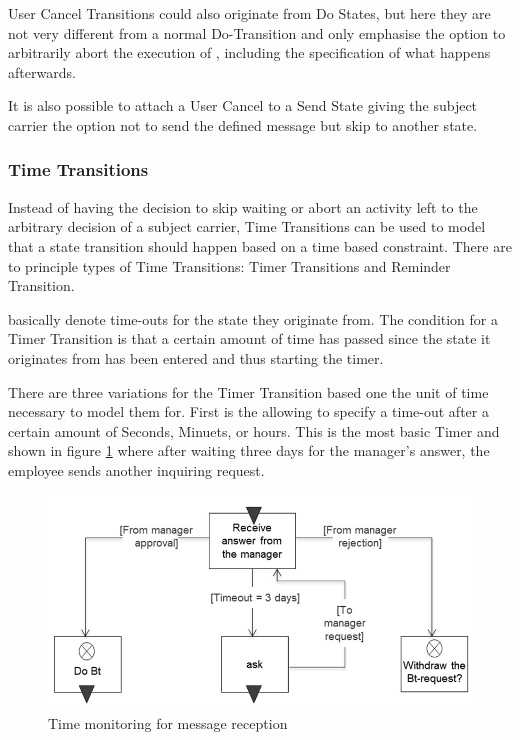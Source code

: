 User Cancel Transitions could also originate from Do States, but here they are not very different from a normal Do-Transition and only emphasise the option to arbitrarily abort the execution of , including the specification of what happens afterwards. 

It is also possible to attach a User Cancel to a Send State giving the subject carrier the option not to send the defined message but skip to another state. 

\subsubsection{Time Transitions}

Instead of having the decision to skip waiting or abort an activity left to the arbitrary decision of a subject carrier, Time Transitions can be used to model that a state transition should happen based on a time based constraint. 
There are to principle types of Time Transitions: Timer Transitions and Reminder Transition.

 basically denote time-outs for the state they originate from.  The condition for a Timer Transition is that a certain amount of time has passed since the state it originates from has been entered and thus starting the timer.

There are three variations for the Timer Transition based one the unit of time necessary to model them for. First is the  allowing to specify a time-out after a certain amount of Seconds, Minuets, or hours. This is the most basic Timer and shown in figure \ref{fig:receivestatetimer} where after waiting three days for the manager's answer, the employee sends another inquiring request.

\begin{figure}[htbp]
	\centering
	\includegraphics[width=0.7\linewidth]{Figures/Ontology/SubjectBehavior/ReceiveStateTimer}
	\caption[Time monitoring for message reception]{Time monitoring for message reception}
	\label{fig:receivestatetimer}
\end{figure}

